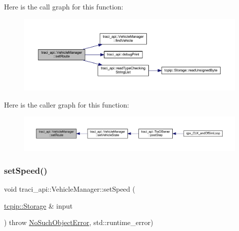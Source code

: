 Here is the call graph for this function\+:
\nopagebreak
\begin{figure}[H]
\begin{center}
\leavevmode
\includegraphics[width=350pt]{classtraci__api_1_1_vehicle_manager_a30063f71f02a6272244d7d1e1e9ec99d_cgraph}
\end{center}
\end{figure}
Here is the caller graph for this function\+:
\nopagebreak
\begin{figure}[H]
\begin{center}
\leavevmode
\includegraphics[width=350pt]{classtraci__api_1_1_vehicle_manager_a30063f71f02a6272244d7d1e1e9ec99d_icgraph}
\end{center}
\end{figure}
\mbox{\label{classtraci__api_1_1_vehicle_manager_a40adaaa7aaaae5708855c6c4715204fe}} 
\subsubsection{\texorpdfstring{set\+Speed()}{setSpeed()}}
{\footnotesize\ttfamily void traci\+\_\+api\+::\+Vehicle\+Manager\+::set\+Speed (\begin{DoxyParamCaption}\item[{\hyperlink{classtcpip_1_1_storage}{tcpip\+::\+Storage} \&}]{input }\end{DoxyParamCaption}) throw  \hyperlink{classtraci__api_1_1_no_such_object_error}{No\+Such\+Object\+Error}, std\+::runtime\+\_\+error) }

